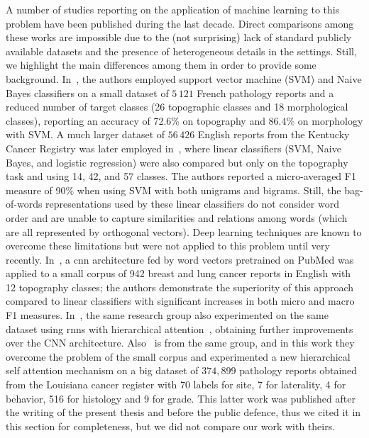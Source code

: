 A number of studies reporting on the application of machine learning
to this problem have been published during the last decade. Direct
comparisons among these works are impossible due to the (not
surprising) lack of standard publicly available datasets and the
presence of 
heterogeneous details in the settings. Still, we highlight the main
differences among them in order to provide some 
background. In~\cite{jouhet_automated_2011}, the authors employed
support vector machine (SVM) and Naive Bayes classifiers on a small
dataset of $5\,121$ French pathology reports and a reduced number of
target classes (26 topographic classes and 18 morphological classes),
reporting an accuracy of 72.6\% on topography and 86.4\% on morphology
with SVM. A much larger dataset of $56\,426$ English reports from the
Kentucky Cancer Registry was later employed
in~\cite{kavuluru_automatic_2013}, where linear classifiers (SVM,
Naive Bayes, and logistic regression) were also compared but only on
the topography task and using 14, 42, and 57 classes. The authors
reported a micro-averaged F1 measure of 90\% when using SVM with both
unigrams and bigrams. Still, the bag-of-words representations used by
these linear classifiers do not consider word order and are
unable to capture similarities and relations among words (which are
all represented by orthogonal vectors). Deep learning techniques are
known to overcome these limitations but were not applied to this
problem until very recently. In~\cite{qiu_deep_2018}, a \ac{cnn}
architecture fed by word vectors pretrained on 
PubMed was applied to a small corpus of 942 breast and lung cancer
reports in English with 12 topography classes; the authors demonstrate
the superiority of this approach compared to linear classifiers with
significant increases in both micro and macro F1
measures. In~\cite{gao_hierarchical_2018}, the same research group also
experimented on the same dataset using \acp{rnn}
with hierarchical attention~\cite{yang_hierarchical_2016}, obtaining
further improvements over the CNN
architecture. Also~\cite{gao2019classifying} is from the same group,
and in this work they overcome the problem of the small corpus and
experimented a new hierarchical self attention mechanism on a big
dataset of $374,899$ pathology reports obtained from the Louisiana
cancer register with 70 labels for site, 7 for laterality, 4 for
behavior, 516 for histology and 9 for grade. This latter work was
published after the writing of the present thesis and before the
public defence, thus we cited it in this section for completeness, but
we did not compare our work with theirs.

